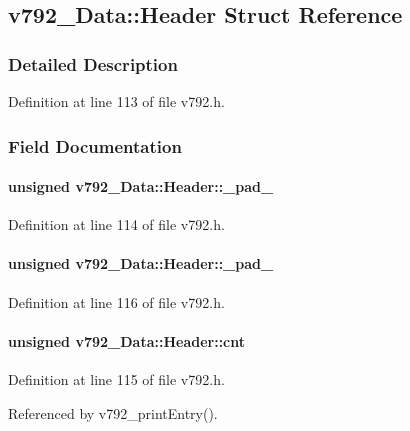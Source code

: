 \subsection{v792\_\-Data::Header Struct Reference}
\label{structv792__Data_1_1Header}


\subsubsection{Detailed Description}


Definition at line 113 of file v792.h.

\subsubsection{Field Documentation}
\paragraph[{\_\-pad\_\-1}]{\setlength{\rightskip}{0pt plus 5cm}unsigned {\bf v792\_\-Data::Header::\_\-pad\_}}\hfill\label{structv792__Data_1_1Header_a377d0cd76d3488e176837e2b02a33ac7}


Definition at line 114 of file v792.h.
\paragraph[{\_\-pad\_\-2}]{\setlength{\rightskip}{0pt plus 5cm}unsigned {\bf v792\_\-Data::Header::\_\-pad\_}}\hfill\label{structv792__Data_1_1Header_ab9c3c89edb77d77d5cfffac147430f5c}


Definition at line 116 of file v792.h.
\paragraph[{cnt}]{\setlength{\rightskip}{0pt plus 5cm}unsigned {\bf v792\_\-Data::Header::cnt}}\hfill\label{structv792__Data_1_1Header_addac5c4f661c31f0cd229509946044fe}


Definition at line 115 of file v792.h.

Referenced by v792\_\-printEntry().
